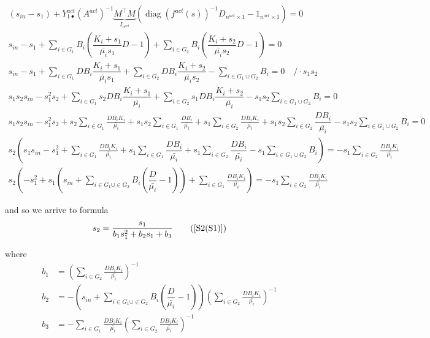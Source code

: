 \documentclass[3p,times]{article}
\DeclareMathOperator{\diag}{diag}
\begin{document}
\begin{align}
(s_{in}-s_1) + Y^{act}_{1\bullet}(A^{act})^{-1}\underbrace{M^\top M}_{I_{n^{act}}}(\diag(f^{act}(s))^{-1} D_{n^{act}\times 1} - 1_{n^{act}\times 1}) = 0\\
\displaystyle s_{in} - s_1 + \sum \limits_{i \in G_1} B_i \left(\dfrac{K_i+s_1}{\bar{\mu_i}s_1}D - 1 \right) + \sum \limits_{i \in G_2 } B_i \left(\dfrac{K_i+s_2}{\bar{\mu_i}s_2}D - 1 \right)= 0 \\
\displaystyle s_{in} - s_1 + \sum \limits_{i \in G_1 } DB_i \dfrac{K_i+s_1}{\bar{\mu_i}s_1}+ \sum \limits_{i \in G_2 } DB_i \dfrac{K_i+s_2}{\bar{\mu_i}s_2} - \sum \limits_{i \in G_1 \cup G_2}B_i= 0 \quad /\cdot s_1s_2
\\
\displaystyle s_1s_2 s_{in}- s^2_1s_2 + \sum \limits_{i \in G_1} s_2DB_i \dfrac{K_i+s_1}{\bar{\mu_i}}+ \sum \limits_{i \in G_2 } s_1DB_i \dfrac{K_i+s_2}{\bar{\mu_i}} - s_1s_2\sum \limits_{i \in G_1 \cup G_2}B_i= 0 \\
\displaystyle s_1s_2 s_{in}- s^2_1s_2 + s_2\sum \limits_{i \in G_1 } \frac{DB_iK_i}{\bar{\mu_i}}+s_1s_2\sum \limits_{i \in G_1 } \frac{DB_i}{\bar{\mu_i}}+ s_1\sum \limits_{i \in G_2 } \frac{DB_iK_i}{\bar{\mu_i}} + s_1s_2\sum \limits_{i \in G_2 } \dfrac{DB_i}{\bar{\mu_i}} - s_1s_2\sum \limits_{i \in G_1 \cup G_2}B_i= 0 \\
\displaystyle s_2\left(s_1s_{in} - s^2_1 + \sum \limits_{i \in G_1} \frac{DB_iK_i}{\bar{\mu_i}} +s_1\sum \limits_{i \in G_1 } \dfrac{DB_i}{\bar{\mu_i}}+s_1\sum \limits_{i \in G_2 } \dfrac{DB_i}{\bar{\mu_i}}  - s_1\sum \limits_{i \in G_1 \cup G_2}B_i  \right) = - s_1\sum \limits_{i \in G_2 } \frac{DB_iK_i}{\bar{\mu_i}} \\
\displaystyle s_2\left( - s^2_1 +s_1\left(s_{in}+\sum \limits_{i \in G_1 \cup \in G_2 } B_i\left(\dfrac{D}{\bar{\mu_i}}-1\right) \right) + \sum \limits_{i \in G_1} \frac{DB_iK_i}{\bar{\mu_i}}\right) = - s_1\sum \limits_{i \in G_2 } \frac{DB_iK_i}{\bar{\mu_i}}
\end{align}
 
and so we arrive to formula
\begin{align}
s_2 = \frac{s_1}{b_1s_1^2+b_2s_1+b_3} \tag{\ref{S2(S1)}}
\end{align}

where
\begin{align}
\displaystyle b_1 & =  \left(\sum \limits_{i \in G_2 } \frac{DB_iK_i}{\bar{\mu_i}} \right)^{-1} \\
\displaystyle b_2 & = -\left(s_{in}+\sum \limits_{i \in G_1 \cup \in G_2 } B_i\left(\dfrac{D}{\bar{\mu_i}}-1\right) \right) \left(\sum \limits_{i \in G_2 } \frac{DB_iK_i}{\bar{\mu_i}} \right)^{-1} \\
\displaystyle b_3 & = -\sum \limits_{i \in G_1} \frac{DB_iK_i}{\bar{\mu_i}} \left(\sum \limits_{i \in G_2 } \frac{DB_iK_i}{\bar{\mu_i}} \right)^{-1} \\
\end{align} 
\end{document}
